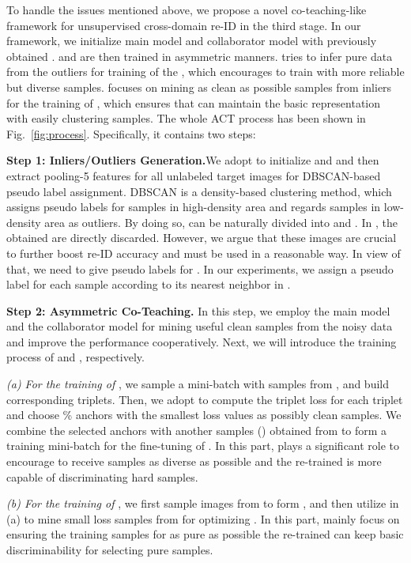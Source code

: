 \documentclass[letterpaper]{article} \usepackage{aaai20}  \usepackage{times}  \usepackage{helvet} \usepackage{courier}  \usepackage[hyphens]{url}  \usepackage{graphicx} \urlstyle{rm} \def\UrlFont{\rm}  \usepackage{graphicx}  \frenchspacing  \setlength{\pdfpagewidth}{8.5in}  \setlength{\pdfpageheight}{11in}  \usepackage{color}
\begin{document}
To handle the issues mentioned above, we propose a novel co-teaching-like framework for unsupervised cross-domain re-ID in the third stage. In our framework, we initialize main model  and collaborator model  with previously obtained .  and  are then trained in asymmetric manners.  tries to infer pure data from the outliers for training of the , which encourages  to train with more reliable but diverse samples.  focuses on mining as clean as possible samples from inliers for the training of , which ensures that  can maintain the basic representation with easily clustering samples. The whole ACT process has been shown in Fig.~\ref{fig:process}. Specifically, it contains two steps:


\textbf{Step 1: Inliers/Outliers Generation.}We adopt  to initialize  and  and then extract pooling-5 features for all unlabeled target images for DBSCAN-based pseudo label assignment. DBSCAN is a density-based clustering method, which assigns pseudo labels for samples in high-density area and regards samples in low-density area as outliers. By doing so,  can be naturally divided into  and . In \cite{song2018unsupervised}, the obtained  are directly discarded. However, we argue that these images are crucial to further boost re-ID accuracy and must be used in a reasonable way. In view of that, we need to give pseudo labels for . In our experiments, we assign a pseudo label for each  sample according to its nearest neighbor in .

\textbf{Step 2: Asymmetric Co-Teaching.} 
In this step, we employ the main model  and the collaborator model  for mining useful clean samples from the noisy data and improve the performance cooperatively. Next, we will introduce the training process of  and , respectively.


\textit{(a)	For the training of }, we sample a mini-batch  with  samples from , and build corresponding  triplets. Then, we adopt  to compute the triplet loss for each triplet and choose \% anchors with the smallest loss values as possibly clean samples. We combine the selected anchors with another  samples () obtained from  to form a training mini-batch for the fine-tuning of . In this part,  plays a significant role to encourage  to receive samples as diverse as possible and the re-trained  is more capable of discriminating hard samples.


\textit{(b)	For the training of }, we first sample  images from  to form , and then utilize  in (a) to mine small loss samples from  for optimizing . In this part,  mainly focus on ensuring the training samples for  as pure as possible the re-trained  can keep basic discriminability for selecting pure samples. 
\end{document}
